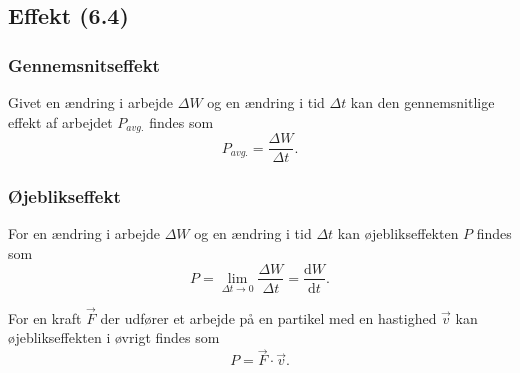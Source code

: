 \subsection{Effekt (6.4)}

\subsubsection{Gennemsnitseffekt} \label{afs:aveff}
Givet en ændring i arbejde $\Delta W$ og en ændring i tid $\Delta t$ kan den gennemsnitlige effekt af arbejdet $P_{avg.}$ findes som
\[ 
  P_{avg.} = \frac{\Delta W}{\Delta t}
.\]

\subsubsection{Øjeblikseffekt} \label{afs:inseff}
For en ændring i arbejde $\Delta W$ og en ændring i tid $\Delta t$ kan øjeblikseffekten $P$ findes som
\[ 
P = \lim_{\Delta t \to 0} \frac{\Delta W}{\Delta t} = \frac{\mathrm{d}W}{\mathrm{d}t}
.\]

For en kraft $\Vec{F}$ der udfører et arbejde på en partikel med en hastighed $\Vec{v}$ kan øjeblikseffekten i øvrigt findes som
\[ 
P = \Vec{F} \cdot \Vec{v}
.\]

